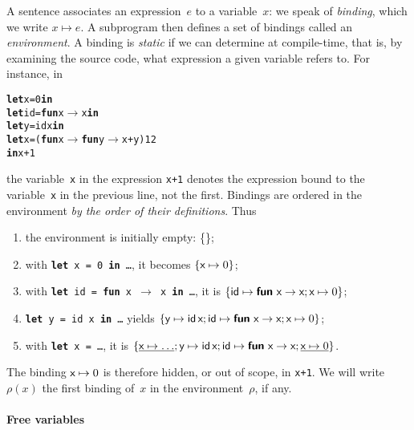 A sentence associates an expression~\(e\) to a variable~\(x\): we
speak of \emph{binding}, which we write \(x \mapsto e\). A subprogram
then defines a set of bindings called an \emph{environment}. A binding
is \emph{static} if we can determine at compile\hyp{}time, that is, by
examining the source code, what expression a given variable refers
to. For instance, in
\begin{alltt}
\textbf{let} x = 0 \textbf{in}
  \textbf{let} id = \textbf{fun} x \(\rightarrow\) x \textbf{in}
  \textbf{let} y = id x \textbf{in}
  \textbf{let} x = (\textbf{fun} x \(\rightarrow\) \textbf{fun} y \(\rightarrow\) x + y) 1 2 
\textbf{in} x+1
\end{alltt}
the variable~\texttt{x} in the expression \texttt{x+1} denotes the
expression bound to the variable~\texttt{x} in the previous line, not
the first. Bindings are ordered in the environment \emph{by the order
of their definitions}. Thus
\begin{enumerate}

  \item the environment is initially empty: \{\};

  \item with \texttt{\textbf{let} x = 0 \textbf{in} \ldots}, it
    becomes $\{\textsf{x} \mapsto 0\}$;

  \item with \texttt{\textbf{let} id = \textbf{fun} x $\rightarrow$ x
    \textbf{in} \ldots}, it is
    $\{\textsf{id} \mapsto \textsf{\textbf{fun}} \,\, \textsf{x} \rightarrow \textsf{x}; \textsf{x} \mapsto
    0\}$;

  \item \texttt{\textbf{let} y = id x \textbf{in} \ldots} yields
    $\{\textsf{y} \mapsto \textsf{id} \, \textsf{x}; \textsf{id} \mapsto \textsf{\textbf{fun}} \,\, \textsf{x} \rightarrow \textsf{x}; \textsf{x} \mapsto
    0\}$;

  \item with \texttt{\textbf{let} x = \ldots}, it is
      $\{\underline{\textsf{x} \mapsto \ldots}; \textsf{y} \mapsto \textsf{id} \, \textsf{x}; \textsf{id} \mapsto \textsf{\textbf{fun}} \,\, \textsf{x} \rightarrow \textsf{x}; \underline{\textsf{x} \mapsto
      0}\}$.

\end{enumerate}
The binding $\textsf{x} \mapsto 0$ is therefore hidden, or out of
scope, in \texttt{x+1}. We will write~\(\rho(x)\) the first binding
of~\(x\) in the environment~\(\rho\), if any.

\paragraph{Free variables}

